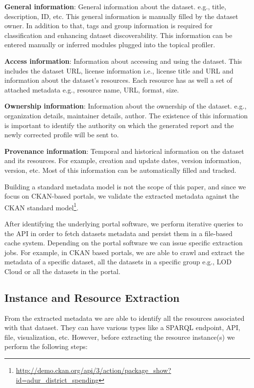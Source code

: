 \documentclass[runningheads,a4paper]{llncs}
\begin{document}
\textbf{General information}: General information about the dataset. e.g., title, description, ID, etc. This general information is manually filled by the dataset owner. In addition to that, tags and group information is required for classification and enhancing dataset discoverability. This information can be entered manually or inferred modules plugged into the topical profiler.

\textbf{Access information}: Information about accessing and using the dataset. This includes the dataset URL, license information i.e., license title and URL and information about the dataset's resources. Each resource has as well a set of attached metadata e.g., resource name, URL, format, size.

\textbf{Ownership information}: Information about the ownership of the dataset. e.g., organization details, maintainer details, author. The existence of this information is important to identify the authority on which the generated report and the newly corrected profile will be sent to.

\textbf{Provenance information}: Temporal and historical information on the dataset and its resources. For example, creation and update dates, version information, version, etc. Most of this information can be automatically filled and tracked.

Building a standard metadata model is not the scope of this paper, and since we focus on CKAN-based portals, we validate the extracted metadata against the CKAN standard model\footnote{\url{http://demo.ckan.org/api/3/action/package\_show?id=adur\_district\_spending}}.

After identifying the underlying portal software, we perform iterative queries to the API in order to fetch datasets metadata and persist them in a file-based cache system.
Depending on the portal software we can issue specific extraction jobs. For example, in CKAN based portals, we are able to crawl and extract the metadata of a specific dataset, all the datasets in a specific group e.g., LOD Cloud or all the datasets in the portal.

\subsection{Instance and Resource Extraction}

From the extracted metadata we are able to identify all the resources associated with that dataset. They can have various types like a SPARQL endpoint, API, file, visualization, etc. However, before extracting the resource instance(s) we perform the following steps:
\end{document}
